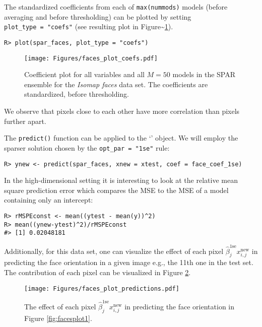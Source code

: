 \documentclass[
  article]{jss}
\newcommand{\class}[1]{`\code{#1}'}
\begin{document}
The standardized coefficients from each of \texttt{max(nummods)} models
(before averaging and before thresholding) can be plotted by setting
\texttt{plot\_type\ =\ "coefs"} (see resulting plot in
Figure\textasciitilde{}\ref{fig:faces_coefs}).

\begin{verbatim}
R> plot(spar_faces, plot_type = "coefs")
\end{verbatim}

\begin{figure}[t!]
\centering
\texttt{[image: Figures/faces\_plot\_coefs.pdf]}
\caption{Coefficient plot for all variables and all $M=50$ models in the SPAR ensemble for the \emph{Isomap faces} data set. The coefficients are standardized, before thresholding.
\label{fig:faces_coefs}}
\end{figure}

We observe that pixels close to each other have more correlation than
pixels further apart.

The \texttt{predict()} function can be applied to the \class{spar.cv}
object. We will employ the sparser solution chosen by the
\texttt{opt\_par\ =\ "1se"} rule:

\begin{verbatim}
R> ynew <- predict(spar_faces, xnew = xtest, coef = face_coef_1se)
\end{verbatim}

In the high-dimensional setting it is interesting to look at the
relative mean square prediction error which compares the MSE to the MSE
of a model containing only an intercept:

\begin{verbatim}
R> rMSPEconst <- mean((ytest - mean(y))^2) 
R> mean((ynew-ytest)^2)/rMSPEconst
#> [1] 0.02048181
\end{verbatim}

Additionally, for this data set, one can visualize the effect of each
pixel \(\hat\beta^\text{1se}_j x^\text{new}_{i,j}\) in predicting the
face orientation in a given image e.g., the 11th one in the test set.
The contribution of each pixel can be visualized in Figure
\ref{fig:faces_predictions}.

\begin{figure}[t!]
\centering
\texttt{[image: Figures/faces\_plot\_predictions.pdf]}
\caption{The effect of each pixel $\hat\beta^\text{1se}_j x^\text{new}_{i,j}$ in predicting the face orientation in Figure \ref{fig:facesplot1}. \label{fig:faces_predictions}}
\end{figure}
\end{document}
